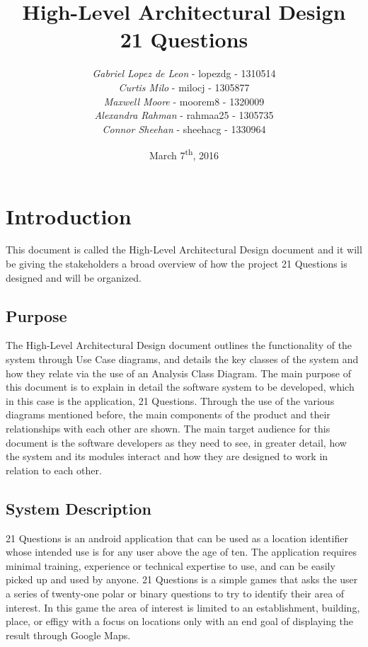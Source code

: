 \documentclass[titlepage]{article}
\title{\Huge{\textbf{High-Level Architectural Design\\21 Questions}}\vspace{9cm}}
\author{\textit{Gabriel Lopez de Leon} - lopezdg - 1310514\\\textit{Curtis Milo} - milocj - 1305877\\\textit{Maxwell Moore} - moorem8 - 1320009\\\textit{Alexandra Rahman} - rahmaa25 - 1305735\\\textit{Connor Sheehan} - sheehacg - 1330964}
\date{March 7\textsuperscript{th}, 2016}
\begin{document}
\maketitle	

\tableofcontents
\listoffigures
\listoftables
\newpage

\section{Introduction}
\label{sec:introduction}

This document is called the High-Level Architectural Design document and it will be giving the stakeholders a broad overview of how the project 21 Questions is designed and will be organized. 

\subsection{Purpose}
\label{sub:purpose}
The High-Level Architectural Design document outlines the functionality of the system through Use Case diagrams, and details the key classes of the system and how they relate via the use of an Analysis Class Diagram. The main purpose of this document is to explain in detail the software system to be developed, which in this case is the application, 21 Questions. Through the use of the various diagrams mentioned before, the main components of the product and their relationships with each other are shown. The main target audience for this document is the software developers as they need to see, in greater detail, how the system and its modules interact and how they are designed to work in relation to each other.

\subsection{System Description}
\label{sub:system_description}
21 Questions is an android application that can be used as a location identifier whose intended use is for any user above the age of ten. The application requires minimal training, experience or technical expertise to use, and can be easily picked up and used by anyone. 21 Questions is a simple games that asks the user a series of twenty-one polar or binary questions to try to identify their area of interest. In this game the area of interest is limited to an establishment, building, place, or effigy with a focus on locations only with an end goal of displaying the result through Google Maps.
\end{document}
